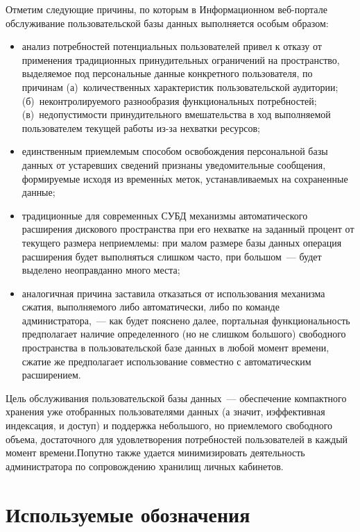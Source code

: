 \begin{multicols}{2}
  Отметим следующие причины, по которым в Информационном веб-пор\-та\-ле 
обслуживание пользовательской базы данных выполняется особым образом:
  \begin{itemize}
\item анализ потребностей потенциальных пользователей привел к отказу от применения 
традиционных принудительных ограничений на пространство, выделяемое под 
персональные данные конкретного пользователя, по причинам (а)~количественных 
характеристик пользовательской аудитории; (б)~неконтролируемого разнообразия 
функциональных потребностей; (в)~недопустимости принудительного вмешательства в 
ход выполняемой пользователем текущей работы из-за нехватки ресурсов;
\item единственным приемлемым способом осво\-бож\-де\-ния персональной базы данных от 
уста\-рев\-ших сведений признаны уведомительные сообщения, формируемые исходя из 
вре\-мен\-н$\acute{\mbox{ы}}$х меток, устанавливаемых на сохраненные данные;
\item традиционные для современных СУБД механизмы автоматического расширения 
дискового пространства при его нехватке на заданный процент от текущего размера 
неприемлемы: при малом размере базы данных операция расширения будет выполняться 
слишком часто, при большом~--- будет выделено неоправданно много места;
\item аналогичная причина заставила отказаться от использования механизма сжатия, 
вы\-пол\-ня\-емо\-го либо автоматически, либо по \mbox{команде} администратора,~--- как будет 
пояснено далее, портальная функциональность предполагает наличие определенного (но 
не слишком большого) свободного пространства в пользовательской базе данных в 
любой момент времени, сжатие же предполагает использование совместно с 
автоматическим расширением.
  \end{itemize}
  
  Цель обслуживания пользовательской базы данных~--- обеспечение компактного 
хранения уже отобран\-ных пользователями данных (а значит, и\linebreak эффективная индексация, и 
доступ) и поддержка небольшого, но приемлемого свободного объема, достаточного для 
удовлетворения потребностей пользователей в каждый момент времени.\linebreak Попутно также 
удается минимизировать деятельность администратора по сопровождению хранилищ 
личных кабинетов.

\section{Используемые обозначения}
  

\end{multicols}
